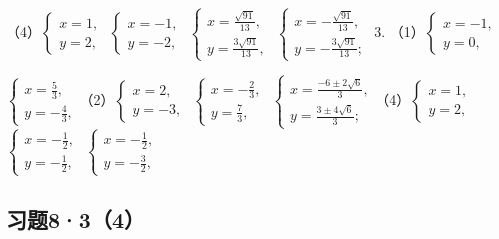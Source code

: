 （4）\(\left\{ \begin{array}{l} x = 1, \\ y = 2, \end{array} \right.\) \(\left\{ \begin{array}{l} x = -1, \\ y = -2, \end{array} \right.\) \(\left\{ \begin{array}{l} x = \frac{\sqrt{91}}{13}, \\ y = \frac{3\sqrt{91}}{13}, \end{array} \right.\) \(\left\{ \begin{array}{l} x = -\frac{\sqrt{91}}{13}, \\ y = -\frac{3\sqrt{91}}{13}; \end{array} \right.\)
3.
（1）\(\left\{ \begin{array}{l} x = -1, \\ y = 0, \end{array} \right.\)

\(\left\{ \begin{array}{l} x = \frac{5}{3}, \\ y = -\frac{4}{3}, \end{array} \right.\)（2）\(\left\{ \begin{array}{l} x = 2, \\ y = -3, \end{array} \right.\) \(\left\{ \begin{array}{l} x = -\frac{2}{3}, \\ y = \frac{7}{3}, \end{array} \right.\) \(\left\{ \begin{array}{l} x = \frac{-6 \pm 2\sqrt{6}}{3}, \\ y = \frac{3 \pm 4\sqrt{6}}{3}; \end{array} \right.\)（4）\(\left\{ \begin{array}{l} x = 1, \\ y = 2, \end{array} \right.\) \(\left\{ \begin{array}{l} x = -\frac{1}{2}, \\ y = -\frac{1}{2}, \end{array} \right.\) \(\left\{ \begin{array}{l} x = -\frac{1}{2}, \\ y = -\frac{3}{2}, \end{array} \right.\)

\subsection{习题8·3（4）}

